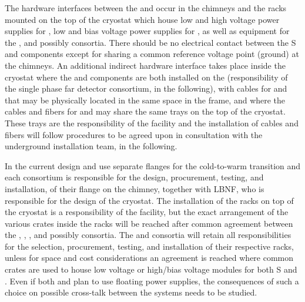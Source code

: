 The hardware interfaces between the  and  occur in the chimneys and the racks mounted on the top of the cryostat which house low and high voltage power supplies for , low and bias voltage power supplies for , as well as equipment for the , and possibly  consortia. There should be no electrical contact between the S and  components except for sharing a common reference voltage point (ground) at the chimneys. An additional indirect hardware interface takes place inside the cryostat where the  and  components are both installed on the  (responsibility of the single phase far detector  consortium,  in the following), with cables for  and  that may be physically located in the same space in the  frame, and where the cables and fibers for  and  may share the same trays on the top of the cryostat. These trays are the responsibility of the facility and the installation of cables and fibers will follow procedures to be agreed upon in consultation with the underground installation team,  in the following.

In the current design  and  use separate flanges for the cold-to-warm transition and each consortium is responsible for the design, procurement, testing, and installation, of their flange on the chimney, together with LBNF, who is responsible for the design of the cryostat. 
The installation of the racks on top of the cryostat is a responsibility of the facility, but the exact arrangement of the various crates inside the racks will be reached after common agreement between the , , , and possibly  consortia. The  and  consortia will retain all responsibilities for the selection, procurement, testing, and installation of their respective racks, unless for space and cost considerations an agreement is reached where common crates are used to house low voltage or high/bias voltage modules for both S and . Even if both  and  plan to use floating power supplies, the consequences of such a choice on possible cross-talk between the systems needs to be studied. 

